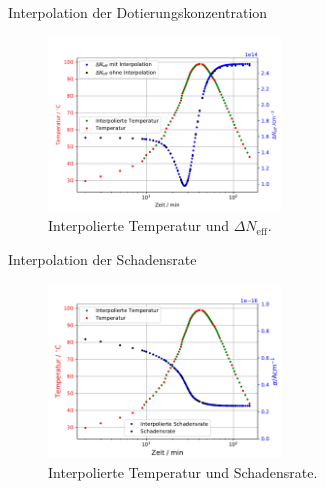 \documentclass[aspectratio=1610, 9pt]{beamer}
\begin{document}
\begin{frame}{Interpolation der Dotierungskonzentration}
  \begin{figure}
      \includegraphics[width=0.55\textwidth]{images/interpolationtdata.PDF}
  \caption{Interpolierte Temperatur und $\Delta N_{\mathrm{eff}}$.}
  \end{figure}
\end{frame}


\begin{frame}{Interpolation der Schadensrate}
  \begin{figure}
      \includegraphics[width=0.55\textwidth]{images/damage_interpolation.PDF}
  \caption{Interpolierte Temperatur und Schadensrate.}
  \end{figure}
\end{frame}
\end{document}
